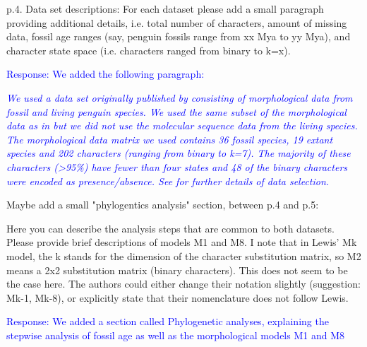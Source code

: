 \documentclass[11pt]{article}
\newcommand{\response}[1]{\medskip{}\textcolor{blue}{{Response: #1}}\medskip{}}
\newcommand{\respquote}[1]{{\medskip{}\textcolor{blue}{{\it #1}}\medskip{}}}
\begin{document}
p.4. Data set descriptions: For each dataset please add a small paragraph providing additional details, i.e. total number of characters, amount of missing data, fossil age ranges (say, penguin fossils range from xx Mya to yy Mya), and character state space (i.e. characters ranged from binary to k=x).

\response{We added the following paragraph:}

\respquote{We used a data set originally published by \cite{ksepka2012} consisting of morphological data from fossil and living penguin 
species. 
We used the same subset of the morphological data as in \cite{gavryushkina2015bayesian} but we did not use the molecular sequence data from the living species. 
The morphological data matrix we used contains 36 fossil species, 19 extant species and 202 characters (ranging from binary to k=7). 
The majority of these characters (\textgreater 95\%) have fewer than four states and 48 of the binary characters were encoded as presence/absence. 
See \cite{gavryushkina2015bayesian} for further details of data selection.}

Maybe add a small "phylogentics analysis" section, between p.4 and p.5: 

Here you can describe the analysis steps that are common to both datasets. Please provide brief descriptions of models M1 and M8. I note that in Lewis' Mk model, the k stands for the dimension of the character substitution matrix, so M2 means a 2x2 substitution matrix (binary characters). This does not seem to be the case here. The authors could either change their notation slightly (suggestion: Mk-1, Mk-8), or explicitly state that their nomenclature does not follow Lewis. 

\response{We added a section called Phylogenetic analyses, explaining the stepwise analysis of fossil age as well as the morphological models M1 and M8}

\end{document}
